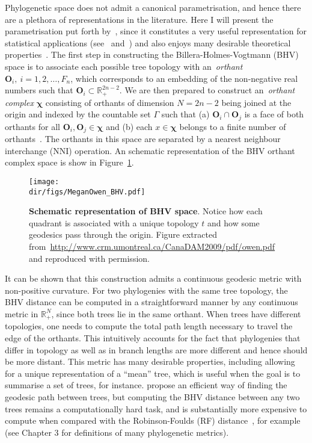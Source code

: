 Phylogenetic space does not admit a canonical parametrisation, and hence there are a plethora of representations in the literature.
Here I will present the parametrisation put forth by~\cite{Billera2001}, since it constitutes a very useful representation for statistical applications (see~\cite{Willis2017} and~\cite{Dinh2017}) and also enjoys many  desirable theoretical properties~\citep{Steel2014,StJohn2017}.
The first step in constructing the Billera-Holmes-Vogtmann (BHV) space is to associate each possible tree topology with an~\textit{orthant} $\boldsymbol O_i,\: i = 1, 2, \ldots, F_n$, which corresponds to an embedding of the non-negative real numbers such that $\boldsymbol O_i \subset \mathbb{R}_+^{2n-2}$.
We are then prepared to construct an~\textit{orthant complex} $\boldsymbol \chi$ consisting of orthants of dimension $N = 2n-2$ being joined at the origin and indexed by the countable set $\Gamma$ such that (a) $\boldsymbol O_i \cap \boldsymbol O_j$ is a face of both orthants for all $\boldsymbol O_i,\boldsymbol O_j \in \boldsymbol
\chi$ and (b) each $x \in \boldsymbol\chi$ belongs to a finite number of orthants~\citep{Dinh2017}.
The orthants in this space are separated by a nearest neighbour interchange (NNI) operation.
An schematic representation of the BHV orthant complex space is show in Figure~\ref{fig:bhv_representation}.

\begin{figure}[!ht]
  \begin{center}
  \texttt{[image: \\dir/figs/MeganOwen\_BHV.pdf]} 
  \end{center}
\caption[Schematic representation of BHV space.]{\textbf{Schematic representation of BHV space}.
Notice how each quadrant is associated with a unique topology $t$ and how some geodesics pass through the origin.
Figure extracted from~\url{http://www.crm.umontreal.ca/CanaDAM2009/pdf/owen.pdf} and reproduced with permission.
}
\label{fig:bhv_representation}
\end{figure}

It can be shown that this construction admits a continuous geodesic metric with non-positive curvature.
For two phylogenies with the same tree topology, the BHV distance can be computed in a straightforward manner by any continuous metric in $\mathbb{R}_+^{N}$, since both trees lie in the same orthant.
When trees have different topologies, one needs to compute the total path length necessary to travel the edge of the orthants.
This intuitively accounts for the fact that phylogenies that differ in topology as well as in branch lengths are more different and hence should be more distant. 
This metric has many desirable properties, including allowing for a unique representation of a ``mean'' tree, which is useful when the goal is to summarise a set of trees, for instance.
\cite{Owen2011} propose an efficient way of finding the geodesic path between trees, but computing the BHV distance between any two trees remains a computationally hard task, and is substantially more expensive to compute when compared with the Robinson-Foulds (RF) distance~\citep{Robinson1981}, for example (see Chapter 3 for definitions of many phylogenetic metrics).


